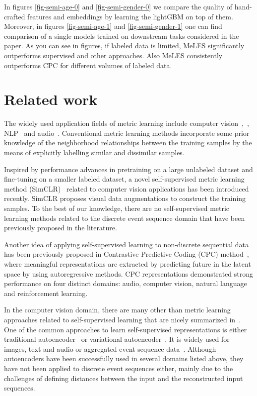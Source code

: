 \documentclass{article}
\begin{document}
In figures \ref{fig-semi-age-0} and \ref{fig-semi-gender-0} we compare the quality of hand-crafted features and embeddings by learning the lightGBM on top of them. Moreover, in figures \ref{fig-semi-age-1} and \ref{fig-semi-gender-1} one can find comparison of a single models trained on downstream tasks considered in the paper. As you can see in figures, if labeled data is limited, MeLES significantly outperforms supervised and other approaches. Also MeLES consistently outperforms CPC for different volumes of labeled data.

\section{Related work} \label{sec-rel-work}

The widely used application fields of metric learning include computer vision~\cite{Chopra2005LearningAS},~\cite{Schroff2015FaceNetAU},  NLP~\cite{Reimers2019SentenceBERTSE} and audio~\cite{Wan2018GeneralizedEL}. Conventional metric learning methods incorporate some prior knowledge of the neighborhood relationships between the training samples by the means of explicitly labelling similar and dissimilar samples.

Inspired by performance advances in pretraining on a large unlabeled dataset and fine-tuning on a smaller labeled dataset, a novel self-supervised metric learning method (SimCLR)~\cite{Chen2020ASF} related to computer vision applications has been introduced recently. SimCLR proposes visual data augmentations to construct the training samples. To the best of our knowledge, there are no self-supervised metric learning methods related to the discrete event sequence domain that have been previously proposed in the literature.

Another idea of applying self-supervised learning to non-discrete sequential data has been previously proposed in Contrastive Predictive Coding (CPC) method~\cite{Oord2018RepresentationLW}, where meaningful representations are extracted by predicting future in the latent space by using autoregressive methods. CPC representations demonstrated strong performance on four distinct domains: audio, computer vision, natural language and reinforcement learning. 

In the computer vision domain, there are many other than metric learning approaches related to self-supervised learning that are nicely summarized in~\cite{Jing2020SelfsupervisedVF}.
One of the common approaches to learn self-supervised representations is either traditional autoencoder~\cite{Rumelhart1986LearningIR} or variational autoencoder~\cite{Kingma2014AutoEncodingVB}. It is widely used for images, text and audio or aggregated event sequence data~\cite{Mancisidor2019LearningLR}. Although autoencoders have been successfully used in several domains listed above, they have not been applied to discrete event sequences either, mainly due to the challenges of defining distances between the input and the reconstructed input sequences.
\end{document}
